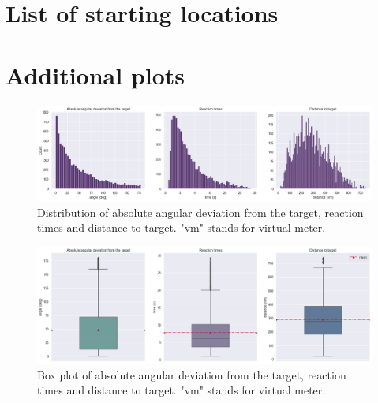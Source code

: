 \chapter{List of starting locations}\label{appx:starting_locations}




\chapter{Additional plots}\label{appx:plots}

\begin{figure}[!htb]
	\centering
	\includegraphics[width=160mm]{figures/ard_hist.png}
	\caption[Distribution of absolute angular deviation from the target, reaction times and distance to target]{Distribution of absolute angular deviation from the target, reaction times and distance to target. "vm" stands for virtual meter.}
	\label{fig:ard_hist}
\end{figure}

\begin{figure}[!htb]
	\centering
	\includegraphics[width=160mm]{figures/ard_box.png}
	\caption[Box plot of absolute angular deviation from the target, reaction times and distance to target]{Box plot of absolute angular deviation from the target, reaction times and distance to target. "vm" stands for virtual meter.}
	\label{fig:ard_box}
\end{figure}


